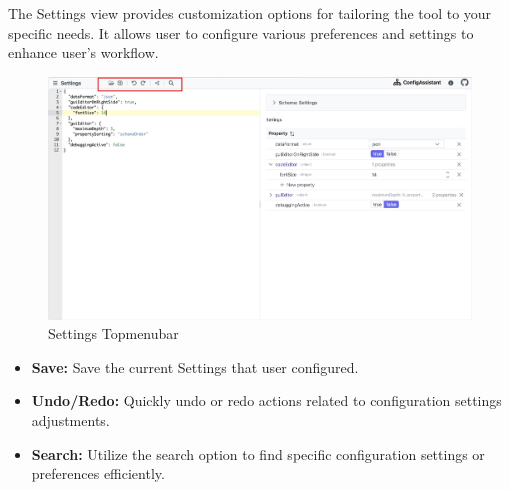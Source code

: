 The Settings view provides customization options for tailoring the tool to your specific needs. 
It allows user to configure various preferences and settings to enhance user's workflow.
\begin{figure}[h]
    \includegraphics[width=3.5 in]{figures/Settings Topmenubar}
    \caption{Settings Topmenubar}
\end{figure}
\begin{itemize}
    \item \textbf{Save:} Save the current Settings that user configured.
    \item \textbf{Undo/Redo:} Quickly undo or redo actions related to configuration settings adjustments.
    \item \textbf{Search:} Utilize the search option to find specific configuration settings or preferences efficiently.
\end{itemize}

